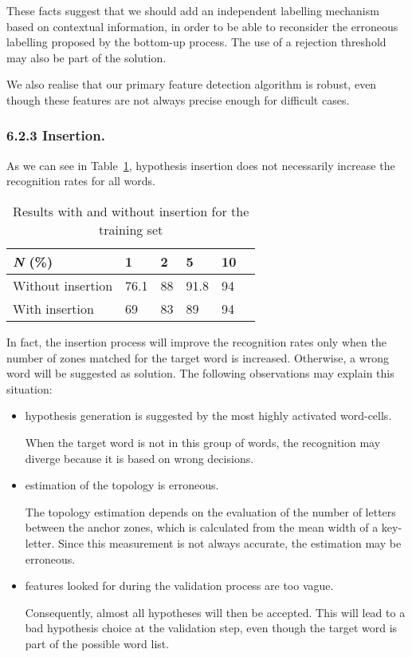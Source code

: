 \documentclass[ijdar]{svjour}
\begin{document}
These facts suggest that we should add an independent labelling mechanism based on contextual information, in order to be able to reconsider the erroneous labelling proposed by the bottom-up process.
The use of a rejection threshold may also be part of the solution.

We also realise that our primary feature detection algorithm is robust, even though these features are not always precise enough for difficult cases.


\subsubsection{6.2.3 Insertion.}
\label{INSERT}


As we can see in Table~\ref{TABINSERT}, hypothesis insertion does not necessarily increase the recognition rates for all words.


\begin{table}%
\caption{Results with and without insertion for the training set}
\label{TABINSERT}
\begin{tabular}{l l l l l l}
\hline
{\it N} (\%)            &1      &2      &5      &10\\
\hline
Without insertion       &76.1   &88     &91.8   &94\\
With insertion          &69     &83     &89     &94\\
\hline
\end{tabular}
\end{table}

In fact, the insertion process will improve the recognition rates only when the number of zones matched for the target word is increased.
Otherwise, a wrong word will be suggested as solution.
The following observations may explain this situation:

\begin{itemize}

\item hypothesis generation is suggested by the most highly activated word-cells.

When the target word is not in this group of words, the recognition may diverge because it is based on wrong decisions.

\item estimation of the topology is erroneous.

The topology estimation depends on the evaluation of the number of letters between the anchor zones, which is calculated from the mean width of a key-letter.
Since this measurement is not always accurate, the estimation may be erroneous.

\item features looked for during the validation process are too vague.

Consequently, almost all hypotheses will then be accepted.
This will lead to a bad hypothesis choice at the validation step, even though the target word is part of the possible word list.

\end{itemize}
\end{document}
